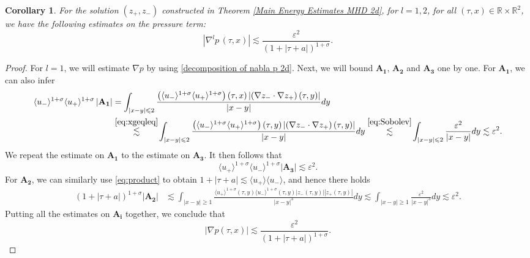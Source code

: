 \documentclass[10pt,reqno]{amsart}
\numberwithin{equation}{section}
\newtheorem{corollary}[theorem]{Corollary}
\begin{document}
\begin{appendix}
\begin{corollary}\label{coro:bound on p 2d}
	For the solution $\left(z_+,z_-\right)$ constructed in Theorem \ref{Main Energy Estimates MHD 2d}, for $l=1,2$, for all $(\tau,x)\in \mathbb{R}\times \mathbb{R}^2$, we have the following estimates on the pressure term:
	\begin{equation*}
		\left|\nabla^l p\,(\tau,x)\right|\lesssim\frac{\varepsilon^2}{\left(1+\left|\tau+a\right|\right)^{1+\sigma}}.
	\end{equation*}
\end{corollary}
\begin{proof}
	For $l=1$, we will estimate $\nabla p$ by using \eqref{decomposition of nabla p 2d}. Next, we will bound $\mathbf{A_1}$, $\mathbf{A_2}$ and $\mathbf{A_3}$ one by one. For $\mathbf{A_1}$, we can also infer
	\begin{align*}
		\langle u_-\rangle^{1+\sigma}\langle u_+\rangle^{{1+\sigma}}\left|\mathbf{A_1}\right|
		&=\int_{|x-y|\leqslant 2}\frac{\left(\langle u_-\rangle^{1+\sigma}\langle u_+\rangle^{{1+\sigma}}\right)(\tau,x)\left|\left(\nabla z_{-}\cdot\nabla z_{+}\right)(\tau,y)\right|}{|x-y|}dy\\
		&\stackrel{\eqref{eq:xgeqleq}}{\lesssim}\!
		\int_{|x-y|\leqslant 2}\frac{\left(\langle u_-\rangle^{1+\sigma}\langle u_+\rangle^{ {1+\sigma}}\right)(\tau,y)\left|\left(\nabla z_{-}\cdot\nabla z_{+}\right)(\tau,y)\right|}{|x-y|}dy
		\stackrel{\eqref{eq:Sobolev}}{\lesssim}\!
		\int_{|x-y|\leqslant 2}\frac{\varepsilon^2}{|x-y|}dy\lesssim \varepsilon^2.
	\end{align*}
	We repeat the estimate on $\mathbf{A_1}$ to the estimate on $\mathbf{A_3}$. It then follows that 
	\begin{equation*}
		\langle u_+\rangle^{1+\sigma}\langle u_-\rangle^{1+\sigma}\left|\mathbf{A_3}\right|
		\lesssim\varepsilon^2.
	\end{equation*}
	For $\mathbf{A_2}$, we can similarly use \eqref{eq:product} to obtain $1+|\tau+a| \lesssim \langle u_{+}\rangle\langle u_{-}\rangle$, and hence there holds 
	\begin{align*}
		\left(1+|\tau+a|\right)^{{{1+\sigma}}}\left|\mathbf{A_2}\right|&\lesssim\int_{|x-y|\geqslant 1}\frac{\langle u_+\rangle^{1+\sigma}(\tau,y)\langle u_-\rangle^{1+\sigma}(\tau,y)\left| z_{-}(\tau,y)\right|\left|z_{+}(\tau,y)\right|}{|x-y|^3}dy
		\lesssim \int_{|x-y|\geqslant 1}\frac{\varepsilon^2}{|x-y|^3}dy
		\lesssim \varepsilon^2.
	\end{align*}
	Putting all the estimates on $\mathbf{A_i}$ together, we conclude that 
	\begin{equation*}\label{nablap 2d}
		|\nabla p(\tau,x)|\lesssim\frac{\varepsilon^2}{\left(1+\left|\tau+a\right|\right)^{1+\sigma}}.
	\end{equation*}
	

\end{proof}
\end{appendix}
\end{document}
